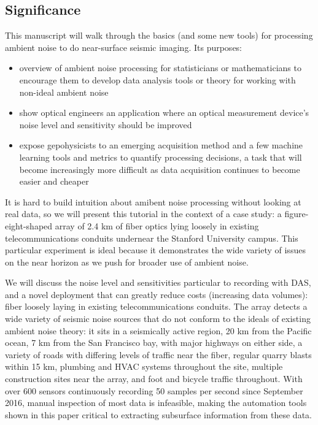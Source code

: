 \documentclass[11pt]{article}
\begin{document}
\vspace{-0.3cm}
\subsection*{Significance} 
\vspace{-0.2cm}
This manuscript will walk through the basics (and some new tools) for processing ambient noise to do near-surface seismic imaging. Its purposes:
\vspace{-0.2cm}
\begin{itemize}
\item overview of ambient noise processing for statisticians or mathematicians to encourage them to develop data analysis tools or theory for working with non-ideal ambient noise
\vspace{-0.2cm}
\item show optical engineers an application where an optical measurement device's noise level and sensitivity should be improved
\vspace{-0.2cm}
\item expose gepohysicists to an emerging acquisition method and a few machine learning tools and metrics to quantify processing decisions, a task that will become increasingly more difficult as data acquisition continues to become easier and cheaper
\end{itemize}
\vspace{-0.2cm}
\par 
It is hard to build intuition about amibent noise processing without looking at real data, so we will present this tutorial in the context of a case study: a figure-eight-shaped array of 2.4 km of fiber optics lying loosely in existing telecommunications conduits undernear the Stanford University campus. This particular experiment is ideal because it demonstrates the wide variety of issues on the near horizon as we push for broader use of ambient noise. 
\par
We will discuss the noise level and sensitivities particular to recording with DAS, and a novel deployment that can greatly reduce costs (increasing data volumes): fiber loosely laying in existing telecommunications conduits. The array detects a wide variety of seismic noise sources that do not conform to the ideals of existing ambient noise theory: it sits in a seismically active region, 20 km from the Pacific ocean, 7 km from the San Francisco bay, with major highways on either side, a variety of roads with differing levels of traffic near the fiber, regular quarry blasts within 15 km, plumbing and HVAC systems throughout the site, multiple construction sites near the array, and foot and bicycle traffic throughout. With over 600 sensors continuously recording 50 samples per second since September 2016, manual inspection of most data is infeasible, making the automation tools shown in this paper critical to extracting subsurface information from these data.
\end{document}
